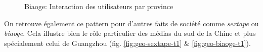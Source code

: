 \begin{figure}[h!]
  \caption{
    Biaoge: Interaction des utilisateurs par province
  }
\end{figure}

On retrouve \'egalement ce pattern pour d{\textquoteright}autres faits de soci\'et\'e comme \textit{sextape} ou \textit{biaoge}. Cela illustre bien le r\^ole particulier des m\'edias du sud de la Chine et plus sp\'ecialement celui de Guangzhou (fig. \ref{fig:geo-sextape-t1} \& \ref{fig:geo-biaoge-t1}). 

